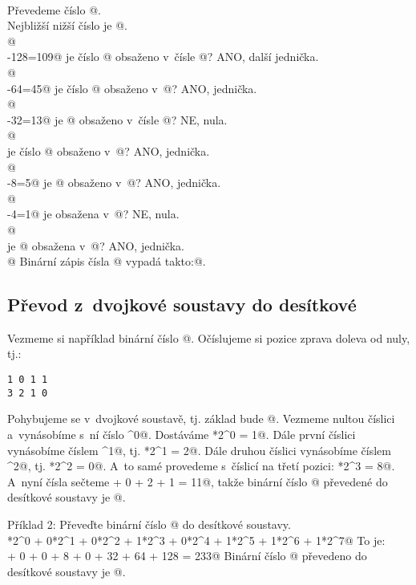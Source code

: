   \\
Převedeme číslo @. \\ 
Nejbližší nižší číslo je @. \\ 
 @  \\
-128=109@ je číslo @ obsaženo v~čísle @? ANO, další jednička. \\
@ \\ 
-64=45@ je číslo @ obsaženo v~@? ANO, jednička. \\
@  \\ 
-32=13@ je @ obsaženo v~čísle @? NE, nula. \\ 
@  \\ 
je číslo @ obsaženo v~@? ANO, jednička. \\
@ \\ 
-8=5@ je @ obsaženo v~@? ANO, jednička. \\
@ \\ 
-4=1@ je  obsažena v~@? NE, nula. \\
@ \\
je @ obsažena v~@? ANO, jednička. \\
@
Binární zápis čísla @ vypadá takto:@.


\subsection{Převod z~dvojkové soustavy do desítkové}

Vezmeme si například binární číslo @. Očíslujeme si pozice zprava doleva od nuly, tj.:
\begin{verbatim}
1 0 1 1
3 2 1 0
\end{verbatim}
Pohybujeme se v~dvojkové soustavě, tj. základ bude @. Vezmeme nultou číslici a~vynásobíme s~ní číslo ^0@. 
Dostáváme *2^0 = 1@.
Dále první číslici vynásobíme číslem ^1@, tj. *2^1 = 2@.
Dále druhou číslici vynásobíme číslem ^2@, tj. *2^2 = 0@.
A~to samé provedeme s~číslicí na třetí pozici: *2^3 = 8@.
A~nyní čísla sečteme  + 0 + 2 + 1 = 11@, takže binární číslo @ převedené do desítkové soustavy je @.

Příklad 2: Převeďte binární číslo @ do desítkové soustavy.\\
*2^0 + 0*2^1 + 0*2^2 + 1*2^3 + 0*2^4 + 1*2^5 + 1*2^6 + 1*2^7@
To je: \\
 + 0 + 0 + 8 + 0 + 32 + 64 + 128 = 233@
Binární číslo @ převedeno do desítkové soustavy je @.

